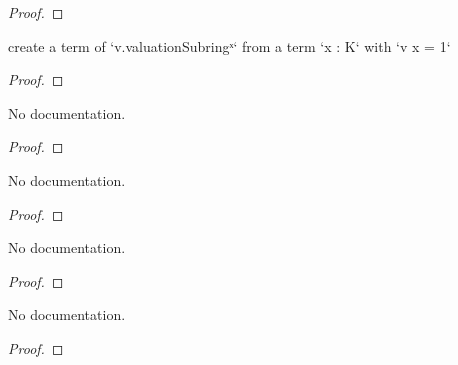\begin{proof}
    \leanok
\end{proof}

\begin{theorem}\label{unitOfValOne_elem}
        \leanok
                create a term of `v.valuationSubringˣ` from a term `x : K` with `v x = 1`
    \end{theorem}

\begin{proof}
    \leanok
\end{proof}

\begin{theorem}\label{val_unitOfValOne_eq_one}
        \leanok
                No documentation.
    \end{theorem}

\begin{proof}
    \leanok
\end{proof}

\begin{theorem}\label{pow_Uniformizer_all}
        \leanok
                No documentation.
    \end{theorem}

\begin{proof}
    \leanok
\end{proof}

\begin{theorem}\label{pow_Uniformizer'}
        \leanok
                No documentation.
    \end{theorem}

\begin{proof}
    \leanok
\end{proof}

\begin{theorem}\label{val_pow_Uniformizer}
        \leanok
                No documentation.
    \end{theorem}

\begin{proof}
    \leanok
\end{proof}

